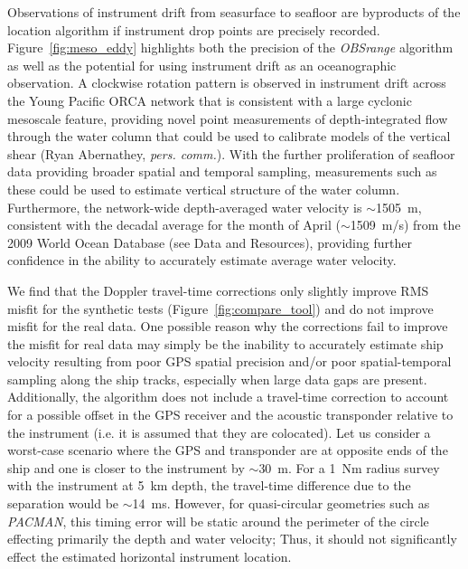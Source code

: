 Observations of instrument drift from seasurface to seafloor are byproducts of the location algorithm if instrument drop points are precisely recorded. Figure~\ref{fig:meso_eddy} highlights both the precision of the \textit{OBSrange} algorithm as well as the potential for using instrument drift as an oceanographic observation. A clockwise rotation pattern is observed in instrument drift across the Young Pacific ORCA network that is consistent with a large cyclonic mesoscale feature, providing novel point measurements of depth-integrated flow through the water column that could be used to calibrate models of the vertical shear (Ryan Abernathey, \textit{pers. comm.}). With the further proliferation of seafloor data providing broader spatial and temporal sampling, measurements such as these could be used to estimate vertical structure of the water column. Furthermore, the network-wide depth-averaged water velocity is $\sim$1505~m, consistent with the decadal average for the month of April ($\sim$1509~m/s) from the 2009 World Ocean Database (see Data and Resources), providing further confidence in the ability to accurately estimate average water velocity.

We find that the Doppler travel-time corrections only slightly improve RMS misfit for the synthetic tests (Figure~\ref{fig:compare_tool}) and do not improve misfit for the real data. One possible reason why the corrections fail to improve the misfit for real data may simply be the inability to accurately estimate ship velocity resulting from poor GPS spatial precision and/or poor spatial-temporal sampling along the ship tracks, especially when large data gaps are present. Additionally, the algorithm does not include a travel-time correction to account for a possible offset in the GPS receiver and the acoustic transponder relative to the instrument (i.e. it is assumed that they are colocated). Let us consider a worst-case scenario where the GPS and transponder are at opposite ends of the ship and one is closer to the instrument by $\sim$30~m. For a 1~Nm radius survey with the instrument at 5~km depth, the travel-time difference due to the separation would be $\sim$14~ms. However, for quasi-circular geometries such as \textit{PACMAN}, this timing error will be static around the perimeter of the circle effecting primarily the depth and water velocity; Thus, it should not significantly effect the estimated horizontal instrument location.